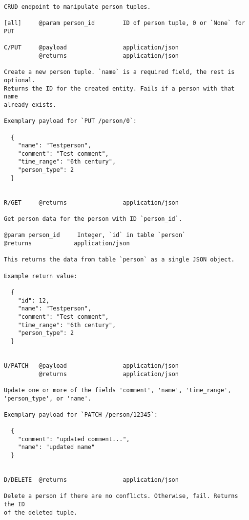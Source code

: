 {\small\begin{verbatim}CRUD endpoint to manipulate person tuples.

[all]     @param person_id        ID of person tuple, 0 or `None` for PUT

C/PUT     @payload                application/json
          @returns                application/json

Create a new person tuple. `name` is a required field, the rest is optional.
Returns the ID for the created entity. Fails if a person with that name
already exists.

Exemplary payload for `PUT /person/0`:

  {
    "name": "Testperson",
    "comment": "Test comment",
    "time_range": "6th century",
    "person_type": 2
  }


R/GET     @returns                application/json

Get person data for the person with ID `person_id`.

@param person_id     Integer, `id` in table `person`
@returns            application/json

This returns the data from table `person` as a single JSON object.

Example return value:

  {
    "id": 12,
    "name": "Testperson",
    "comment": "Test comment",
    "time_range": "6th century",
    "person_type": 2
  }


U/PATCH   @payload                application/json
          @returns                application/json

Update one or more of the fields 'comment', 'name', 'time_range',
'person_type', or 'name'.

Exemplary payload for `PATCH /person/12345`:

  {
    "comment": "updated comment...",
    "name": "updated name"
  }


D/DELETE  @returns                application/json

Delete a person if there are no conflicts. Otherwise, fail. Returns the ID
of the deleted tuple.

\end{verbatim}}
